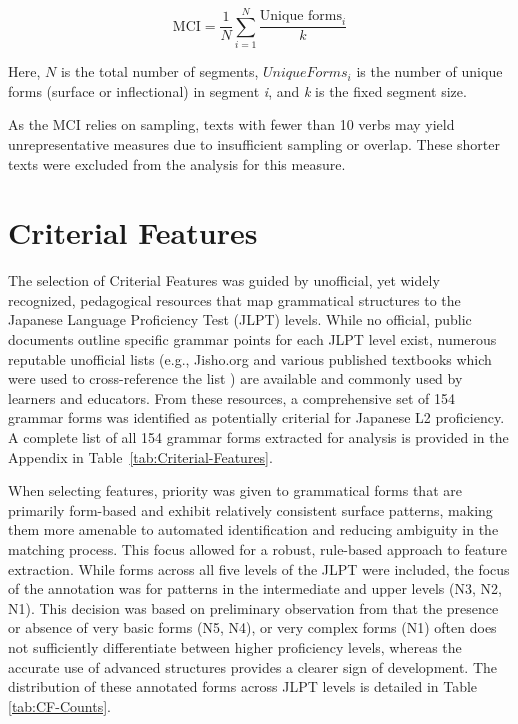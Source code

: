 \begin{equation}
    \text{MCI} = \frac{1}{N}\sum_{i=1}^{N} \frac{\text{Unique forms}_i}{k}
\end{equation}

Here, $N$ is the total number of segments, $Unique Forms_i$ is the number of unique forms (surface or
inflectional) in segment \textit{i}, and \textit{k} is the fixed segment size.

As the MCI relies on sampling, texts with fewer than 10 verbs may yield unrepresentative measures due to
insufficient sampling or overlap. These shorter texts were excluded from the analysis for this measure.

\section{Criterial Features}
The selection of Criterial Features was guided by unofficial, yet widely recognized, pedagogical resources that map
grammatical structures to the Japanese Language Proficiency Test (JLPT) levels. While no official, public documents
outline specific grammar points for each JLPT level exist, numerous reputable unofficial lists (e.g., Jisho.org \citep{jisho.org} and
various published textbooks which were used to cross-reference the list
\citep{nihongo_n5_all_skills,nihongo_n4,nihongo_n3, nihongo_n2,nihongo_n1}) are available and
commonly used by learners and educators. From these resources, a comprehensive set of 154 grammar forms was
identified as potentially criterial for Japanese L2 proficiency. A complete list of all 154 grammar forms extracted
for analysis is provided in the Appendix in Table~\ref{tab:Criterial-Features}.

When selecting features, priority was given to grammatical forms that are primarily form-based and exhibit
relatively consistent surface patterns, making them more amenable to automated identification and reducing
ambiguity in the matching process. This focus allowed for a robust, rule-based approach to feature extraction. While
forms across all five levels of the JLPT were included, the focus of the annotation was for patterns in the
intermediate and upper levels (N3, N2, N1). This decision was based on preliminary observation from \citet{akef2025}
that the presence or absence of very basic forms (N5, N4), or very complex forms (N1) often does not sufficiently
differentiate between higher
proficiency levels, whereas the accurate use of advanced structures provides a clearer sign of development. The
distribution of these annotated forms across JLPT levels is detailed in Table
\ref{tab:CF-Counts}.

